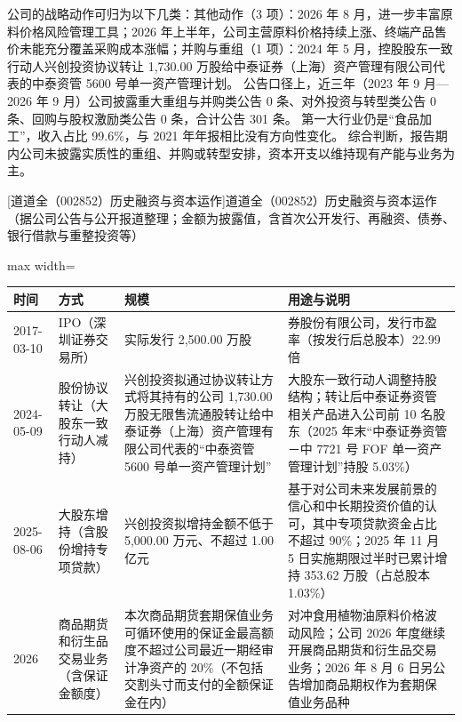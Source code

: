  公司的战略动作可归为以下几类：其他动作（3 项）：2026 年 8 月，进一步丰富原料价格风险管理工具；2026 年上半年，公司主营原料价格持续上涨、终端产品售价未能充分覆盖采购成本涨幅；并购与重组（1 项）：2024 年 5 月，控股股东一致行动人兴创投资协议转让 1,730.00 万股给中泰证券（上海）资产管理有限公司代表的中泰资管 5600 号单一资产管理计划。 公告口径上，近三年（2023 年 9 月---2026 年 9 月）公司披露重大重组与并购类公告 0 条、对外投资与转型类公告 0 条、回购与股权激励类公告 0 条，合计公告 301 条。 第一大行业仍是“食品加工”，收入占比 99.6\%，与 2021 年年报相比没有方向性变化。 综合判断，报告期内公司未披露实质性的重组、并购或转型安排，资本开支以维持现有产能与业务为主。

\begin{center}\small\setlength{\tabcolsep}{4pt}
[道道全（002852）历史融资与资本运作]{道道全（002852）历史融资与资本运作（据公司公告与公开报道整理；金额为披露值，含首次公开发行、再融资、债券、银行借款与重整投资等）}
\begin{adjustbox}{max width=\textwidth}
\begin{tabular}{@{}p{1.45cm}p{2.55cm}p{4.05cm}p{4.95cm}@{}}
\toprule
时间 & 方式 & 规模 & 用途与说明 \\
\midrule
2017-03-10 & IPO（深圳证券交易所） & 实际发行 2,\allowbreak{}500.00 万股 & 券股份有限公司，\allowbreak{}发行市盈率（按发行后总股本）22.99 倍 \\
2024-05-09 & 股份协议转让（大股东一致行动人减持） & 兴创投资拟通过协议转让方式将其持有的公司 1,\allowbreak{}730.00 万股无限售流通股转让给中泰证券（上海）资产管理有限公司代表的“中泰资管 5600 号单一资产管理计划” & 大股东一致行动人调整持股结构；转让后中泰证券资管相关产品进入公司前 10 名股东（2025 年末“中泰证券资管－中 7721 号 FOF 单一资产管理计划”持股 5.03\%） \\
2025-08-06 & 大股东增持（含股份增持专项贷款） & 兴创投资拟增持金额不低于 5,\allowbreak{}000.00 万元、\allowbreak{}不超过 1.00 亿元 & 基于对公司未来发展前景的信心和中长期投资价值的认可，\allowbreak{}其中专项贷款资金占比不超过 90\%；2025 年 11 月 5 日实施期限过半时已累计增持 353.62 万股（占总股本 1.03\%） \\
2026 & 商品期货和衍生品交易业务（含保证金额度） & 本次商品期货套期保值业务可循环使用的保证金最高额度不超过公司最近一期经审计净资产的 20\%（不包括交割头寸而支付的全额保证金在内） & 对冲食用植物油原料价格波动风险；公司 2026 年度继续开展商品期货和衍生品交易业务；2026 年 8 月 6 日另公告增加商品期权作为套期保值业务品种 \\
\bottomrule
\end{tabular}
\end{adjustbox}
\end{center}

